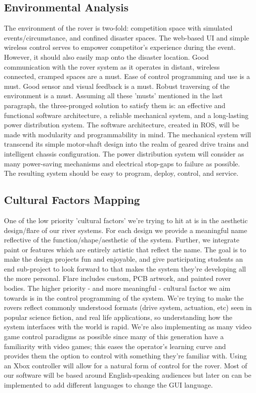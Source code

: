 \documentclass[a4paper, 10pt]{article}
\begin{document}
	\subsection{Environmental Analysis}
	The environment of the rover is two-fold: competition space with simulated events/circumstance, and confined disaster spaces. The web-based UI and simple wireless control serves to empower competitor's experience during the event. However, it should also easily map onto the disaster location. Good communication with the rover system as it operates in distant, wireless connected, cramped spaces are a must. Ease of control programming and use is a must. Good sensor and visual feedback is a must. Robust traversing of the environment is a must. 
Assuming all these 'musts' mentioned in the last paragraph, the three-pronged solution to satisfy them is: an effective and functional software architecture, a reliable mechanical system, and a long-lasting power distribution system. The software architecture, created in ROS, will be made with modularity and programmability in mind. The mechanical system will transcend its simple motor-shaft design into the realm of geared drive trains and intelligent chassis configuration. The power distribution system will consider as many power-saving mechanisms and electrical stop-gaps to failure as possible. The resulting system should be easy to program, deploy, control, and service.

	\subsection{Cultural Factors Mapping}
	One of the low priority 'cultural factors' we're trying to hit at is in the aesthetic design/flare of our river systems. For each design we provide a meaningful name reflective of the function/shape/aesthetic of the system. Further, we integrate paint or features which are entirely artistic that reflect the name. The goal is to make the design projects fun and enjoyable, and give participating students an end sub-project to look forward to that makes the system they're developing all the more personal. Flare includes custom, PCB artwork, and painted rover bodies. 
The higher priority - and more meaningful - cultural factor we aim towards is in the control programming of the system. We're trying to make the rovers reflect commonly understood formats (drive system, actuation, etc) seen in popular science fiction, and real life applications, so understanding how the system interfaces with the world is rapid. We're also implementing as many video game control paradigms as possible since many of this generation have a familiarity with video games; this eases the operator's learning curve and provides them the option to control with something they're familiar with. 
Using an Xbox controller will allow for a natural form of control for the rover. Most of our software will be based around English-speaking audiences but later on can be implemented to add different languages to change the GUI language.
\end{document}
